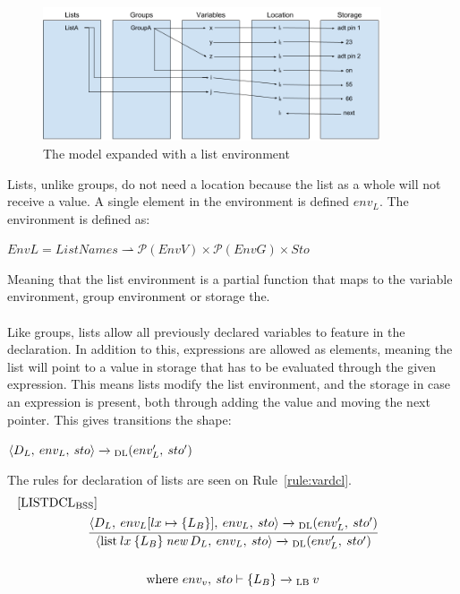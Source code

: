 \begin{figure}[H]
\centering
  \includegraphics[width=10cm]{figures/semantics/4.png}
  \caption{The model expanded with a list environment}
  \label{fig:listgraphic}
\end{figure}
\noindent
Lists, unlike groups, do not need a location because the list as a whole will not receive a value. A single element in the environment is defined $env_L$. The environment is defined as:
\begin{center}
$EnvL = ListNames \rightharpoonup \mathcal{P}(EnvV) \times \mathcal{P}(EnvG) \times Sto$
\end{center}
Meaning that the list environment is a partial function that maps to the variable environment, group environment or storage the. 
\\\\
Like groups, lists allow all previously declared variables to feature in the declaration. In addition to this, expressions are allowed as elements, meaning the list will point to a value in storage that has to be evaluated through the given expression. This means lists modify the list environment, and the storage in case an expression is present, both through adding the value and moving the next pointer. This gives transitions the shape:
\begin{center}
$\langle D_L,  \: env_L, \: sto\rangle \xrightarrow{}\textsubscript{DL} (env'_L, \: sto')$
\end{center}
The rules for declaration of lists are seen on Rule~\ref{rule:vardcl}.
\begin{equation}\label{rule:listdcl}
\begin{split}
\begin{minipage}{\linewidth}
$[\text{LISTDCL}_\text{BSS}]$
\end{minipage}
\\
\begin{minipage}{\linewidth}
\centering
$\cfrac{\langle D_L,  \: env_L[lx \mapsto \{L_B\}], \: env_L, \: sto \rangle \xrightarrow{}\textsubscript{DL} (env'_L, \: sto')}{\langle\text{list} \: lx \: \{L_B\} \: \textit{new} \: D_L, \: env_L, \: sto \rangle \xrightarrow{}\textsubscript{DL}(env'_L, \: sto')}$
\end{minipage}
\\\\
\begin{minipage}{\linewidth}
\centering
where $env_v, \: sto \vdash \{L_B\} \xrightarrow{}\textsubscript{LB} \: v$
\end{minipage}
\end{split}
\end{equation}
